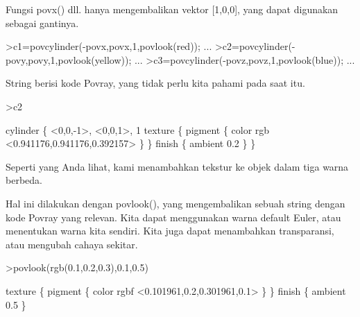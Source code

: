 \documentclass[a4paper,10pt]{article}
\begin{document}
\begin{eulernotebook}
\begin{eulercomment}
\begin{eulercomment}
\begin{eulercomment}
\begin{eulercomment}
\begin{eulercomment}
\begin{eulercomment}
\begin{eulercomment}
\begin{eulercomment}
\begin{eulercomment}
\begin{eulercomment}
\begin{eulercomment}
\begin{eulercomment}
\begin{eulercomment}
\begin{eulercomment}
\begin{eulercomment}
\begin{eulercomment}
\begin{eulercomment}
Fungsi povx() dll. hanya mengembalikan vektor [1,0,0], yang dapat
digunakan sebagai gantinya.
\end{eulercomment}
\begin{eulerprompt}
>c1=povcylinder(-povx,povx,1,povlook(red)); ...
>c2=povcylinder(-povy,povy,1,povlook(yellow)); ...
>c3=povcylinder(-povz,povz,1,povlook(blue)); ...
\end{eulerprompt}
\begin{eulercomment}
String berisi kode Povray, yang tidak perlu kita pahami pada saat itu.
\end{eulercomment}
\begin{eulerprompt}
>c2
\end{eulerprompt}
\begin{euleroutput}
  cylinder \{ <0,0,-1>, <0,0,1>, 1
   texture \{ pigment \{ color rgb <0.941176,0.941176,0.392157> \}  \} 
   finish \{ ambient 0.2 \} 
   \}
\end{euleroutput}
\begin{eulercomment}
Seperti yang Anda lihat, kami menambahkan tekstur ke objek dalam tiga
warna berbeda.

Hal ini dilakukan dengan povlook(), yang mengembalikan sebuah string
dengan kode Povray yang relevan. Kita dapat menggunakan warna default
Euler, atau menentukan warna kita sendiri. Kita juga dapat menambahkan
transparansi, atau mengubah cahaya sekitar.
\end{eulercomment}
\begin{eulerprompt}
>povlook(rgb(0.1,0.2,0.3),0.1,0.5)
\end{eulerprompt}
\begin{euleroutput}
   texture \{ pigment \{ color rgbf <0.101961,0.2,0.301961,0.1> \}  \} 
   finish \{ ambient 0.5 \} 
  

\end{euleroutput}
\end{eulercomment}
\end{eulercomment}
\end{eulercomment}
\end{eulercomment}
\end{eulercomment}
\end{eulercomment}
\end{eulercomment}
\end{eulercomment}
\end{eulercomment}
\end{eulercomment}
\end{eulercomment}
\end{eulercomment}
\end{eulercomment}
\end{eulercomment}
\end{eulercomment}
\end{eulercomment}
\end{eulernotebook}
\end{document}
